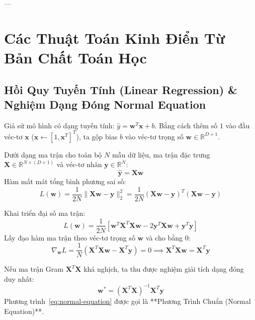 ---

\section{Các Thuật Toán Kinh Điển Từ Bản Chất Toán Học}
\label{sec:classical-algorithms}

\subsection{Hồi Quy Tuyến Tính (Linear Regression) \& Nghiệm Dạng Đóng Normal Equation}

Giả sử mô hình có dạng tuyến tính: $\hat{y} = \mathbf{w}^T \mathbf{x} + b$. Bằng cách thêm số $1$ vào đầu véc-tơ $\mathbf{x}$ ($\mathbf{x} \gets [1, \mathbf{x}^T]^T$), ta gộp bias $b$ vào véc-tơ trọng số $\mathbf{w} \in \mathbb{R}^{D+1}$.

Dưới dạng ma trận cho toàn bộ $N$ mẫu dữ liệu, ma trận đặc trưng $\mathbf{X} \in \mathbb{R}^{N \times (D+1)}$ và véc-tơ nhãn $\mathbf{y} \in \mathbb{R}^N$:
\begin{equation}
\hat{\mathbf{y}} = \mathbf{X} \mathbf{w}
\end{equation}
Hàm mất mát tổng bình phương sai số:
\begin{equation}
L(\mathbf{w}) = \frac{1}{2N} \|\mathbf{X} \mathbf{w} - \mathbf{y}\|_2^2 = \frac{1}{2N} (\mathbf{X} \mathbf{w} - \mathbf{y})^T (\mathbf{X} \mathbf{w} - \mathbf{y})
\end{equation}

Khai triển đại số ma trận:
\begin{equation}
L(\mathbf{w}) = \frac{1}{2N} \left[ \mathbf{w}^T \mathbf{X}^T \mathbf{X} \mathbf{w} - 2 \mathbf{y}^T \mathbf{X} \mathbf{w} + \mathbf{y}^T \mathbf{y} \right]
\end{equation}
Lấy đạo hàm ma trận theo véc-tơ trọng số $\mathbf{w}$ và cho bằng $0$:
\begin{equation}
\nabla_\mathbf{w} L = \frac{1}{N} \left( \mathbf{X}^T \mathbf{X} \mathbf{w} - \mathbf{X}^T \mathbf{y} \right) = 0 \implies \mathbf{X}^T \mathbf{X} \mathbf{w} = \mathbf{X}^T \mathbf{y}
\end{equation}

Nếu ma trận Gram $\mathbf{X}^T \mathbf{X}$ khả nghịch, ta thu được nghiệm giải tích dạng đóng duy nhất:
\begin{equation}
\mathbf{w}^* = (\mathbf{X}^T \mathbf{X})^{-1} \mathbf{X}^T \mathbf{y}
\label{eq:normal-equation}
\end{equation}
Phương trình~\eqref{eq:normal-equation} được gọi là **Phương Trình Chuẩn (Normal Equation)**.

